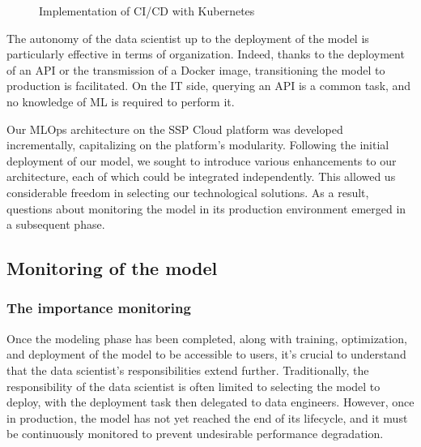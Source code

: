 \begin{figure}[htbp]
    \centering
    \caption{Implementation of CI/CD with Kubernetes}
    \label{fig:ci-cd}
\end{figure}

The autonomy of the data scientist up to the deployment of the model is particularly effective in terms of organization. Indeed, thanks to the deployment of an API or the transmission of a Docker image, transitioning the model to production is facilitated. On the IT side, querying an API is a common task, and no knowledge of ML is required to perform it.

Our MLOps architecture on the SSP Cloud platform was developed incrementally, capitalizing on the platform's modularity. Following the initial deployment of our model, we sought to introduce various enhancements to our architecture, each of which could be integrated independently. This allowed us considerable freedom in selecting our technological solutions. As a result, questions about monitoring the model in its production environment emerged in a subsequent phase.

\subsection{Monitoring of the model}

\subsubsection{The importance monitoring}

Once the modeling phase has been completed, along with training, optimization, and deployment of the model to be accessible to users, it's crucial to understand that the data scientist's responsibilities extend further. Traditionally, the responsibility of the data scientist is often limited to selecting the model to deploy, with the deployment task then delegated to data engineers. However, once in production, the model has not yet reached the end of its lifecycle, and it must be continuously monitored to prevent undesirable performance degradation.

